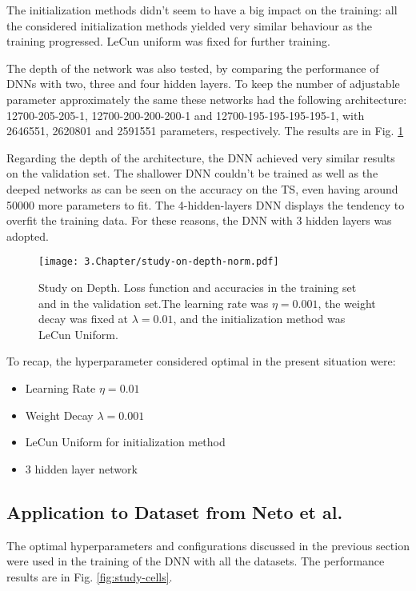 The initialization methods didn't seem to have a big impact on the training: all the considered initialization methods yielded very similar behaviour as the training progressed. LeCun uniform was fixed for further training.


The depth of the network was also tested, by comparing the performance of DNNs with two, three and four hidden layers. To keep the number of adjustable parameter approximately the same these networks had the following architecture:
12700-205-205-1, 12700-200-200-200-1 and 12700-195-195-195-195-1, with 2646551, 2620801 and 2591551 parameters, respectively. The results are in Fig. \ref{fig:study-depth}

Regarding the depth of the architecture, the DNN achieved very similar results on the validation set. The shallower DNN couldn't be trained as well as the deeped networks as can be seen on the accuracy on the TS, even having around 50000 more parameters to fit. The 4-hidden-layers DNN displays the tendency to overfit the training data. For these reasons, the DNN with 3 hidden layers was adopted.

\begin{figure}[htbp]
	\centering
	\texttt{[image: 3.Chapter/study-on-depth-norm.pdf]}
	\caption{Study on Depth. Loss function and accuracies in the training set and in the validation set.The learning rate was $\eta = 0.001$, the weight decay was fixed at $\lambda = 0.01$, and the initialization method was LeCun Uniform.
}
\label{fig:study-depth}
\end{figure}

To recap, the hyperparameter considered optimal in the present situation were:
\begin{itemize}
\item Learning Rate $\eta = 0.01$
\item Weight Decay $\lambda = 0.001$
\item LeCun Uniform for initialization method
\item 3 hidden layer network
\end{itemize}

\subsection{Application to Dataset from Neto et al.}
\label{subsec:application}
The optimal hyperparameters and configurations discussed in the previous section were used in the training of the DNN with all the datasets. The performance results are in Fig. \ref{fig:study-cells}.

